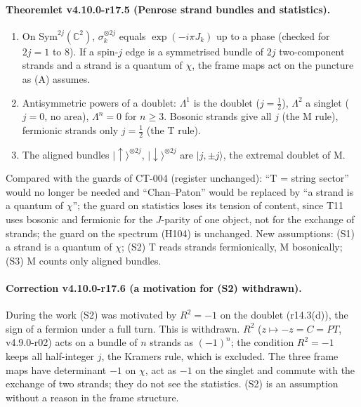 \paragraph{Theoremlet v4.10.0-r17.5 (Penrose strand bundles and statistics).}
\begin{enumerate}[leftmargin=2em]
\item[(a)] On \(\mathrm{Sym}^{2j}(\mathbb C^2)\), \(\sigma_k^{\otimes2j}\) equals \(\exp(-i\pi J_k)\) up to a phase (checked for \(2j=1\) to \(8\)).  If a spin-\(j\) edge is a
symmetrised bundle of \(2j\) two-component strands and a strand is a quantum of \(\chi\), the frame maps act on the puncture as (A)
assumes.
\item[(b)] Antisymmetric powers of a doublet: \(\Lambda^1\) is the doublet (\(j=\tfrac12\)), \(\Lambda^2\) a singlet (\(j=0\), no area), \(\Lambda^n=0\) for \(n\ge3\).
Bosonic strands give all \(j\) (the M rule), fermionic strands only \(j=\tfrac12\) (the T rule).
\item[(c)] The aligned bundles \(|{\uparrow}\rangle^{\otimes2j}\), \(|{\downarrow}\rangle^{\otimes2j}\) are \(|j,\pm j\rangle\), the extremal doublet of M.
\end{enumerate}
Compared with the guards of CT-004 (register unchanged): ``T = string sector'' would no longer be needed and ``Chan--Paton'' would
be replaced by ``a strand is a quantum of \(\chi\)''; the guard on statistics loses its tension of content, since T11 uses bosonic and
fermionic for the \(J\)-parity of one object, not for the exchange of strands; the guard on the spectrum (H104) is unchanged.  New
assumptions: (S1) a strand is a quantum of \(\chi\); (S2) T reads strands fermionically, M bosonically; (S3) M counts only aligned
bundles.

\paragraph{Correction v4.10.0-r17.6 (a motivation for (S2) withdrawn).}
During the work (S2) was motivated by \(R^2=-1\) on the doublet (r14.3(d)), the sign of a fermion under a full turn.  This is
withdrawn.  \(R^2\) (\(z\mapsto-z=C=PT\), v4.9.0-r02) acts on a bundle of \(n\) strands as \((-1)^n\); the condition \(R^2=-1\) keeps all
half-integer \(j\), the Kramers rule, which is excluded.  The three frame maps have determinant \(-1\) on \(\chi\), act as \(-1\) on the
singlet and commute with the exchange of two strands; they do not see the statistics.  (S2) is an assumption without a
reason in the frame structure.

